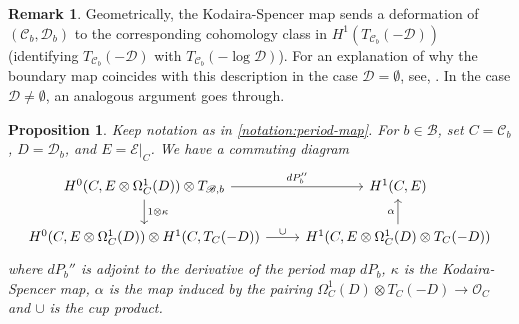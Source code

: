 \documentclass[12 pt]{amsart}
\theoremstyle{plain}
\newtheorem{proposition}[subsubsection]{Proposition}
\theoremstyle{definition}
\newtheorem{remark}[subsubsection]{Remark}
\theoremstyle{remark}
\numberwithin{equation}{section}
\begin{document}
\begin{remark}
	\label{remark:kodaira-spencer}
	Geometrically, the Kodaira-Spencer map sends a deformation of $(\mathscr C_b, \mathscr D_b)$ to the corresponding
cohomology class in $H^1(T_{\mathscr C_b}(-\mathscr D))$ (identifying $T_{\mathscr C_b}(-\mathscr D)$ with $T_{\mathscr{C}_b}(-\log\mathscr{D})$).
For an explanation of why the boundary map coincides with this description in
the case $\mathscr D = \emptyset$, see, \cite[\S9.1.2]{Voisin:hodgeTheory}.
In the case $\mathscr D \neq \emptyset$, an analogous argument goes through.
\end{remark}

\begin{proposition}
	\label{proposition:period-map}
	Keep notation as in \autoref{notation:period-map}.
	For $b \in \mathscr B$, set $C=\mathscr{C}_b$, $D=\mathscr{D}_b$, and $E=\mathscr{E}|_C$. We have a commuting diagram
	\begin{equation}
		\label{equation:period-to-cup}
		\begin{tikzcd} 
			H^0( C, E \otimes \Omega^1_{ C}(D)) \otimes
			T_{\mathscr B,b} \ar {r}{dP_b''} \ar {d}{1 \otimes \kappa} & H^1( C,  E) \\
			H^0( C,  E \otimes \Omega^1_{ C}( D)) \otimes
			H^1( C, T_{ C}(- D)) \ar {r}{\cup} & H^1( C,  E
				\otimes \Omega^1_{ C}( D) \otimes T_{ C}(- D)) \ar{u}{\alpha}
	\end{tikzcd}\end{equation}
	where $dP_b''$ is adjoint to the derivative of the period map $dP_b$, $\kappa$ is the Kodaira-Spencer map, $\alpha$ is the map induced by the pairing 
	$\Omega^1_{ C}( D) \otimes T_{ C}(- D) \to \mathscr O_{ C}$
	and $\cup$ is the cup product.
\end{proposition}
\end{document}
